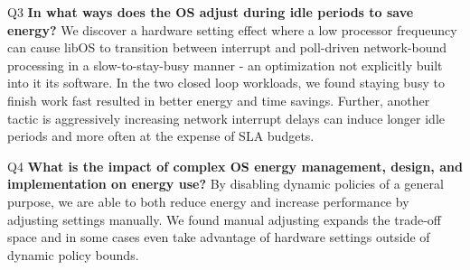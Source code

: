 \begin{compactdesc}

\item[Q3] {\bf In what ways does the OS adjust during idle periods to save energy?}
We discover a hardware setting effect where a low processor frequeuncy can cause libOS to transition between interrupt and poll-driven network-bound processing in a slow-to-stay-busy manner - an optimization not explicitly built into it its software. In the two closed loop workloads, we found staying busy to finish work fast resulted in better energy and time savings. Further, another tactic is aggressively increasing network interrupt delays can induce longer idle periods and more often at the expense of SLA budgets.


\item[Q4] {\bf What is the impact of complex OS energy management, design, and implementation on energy use?}
By disabling dynamic policies of a general purpose, we are able to both reduce energy and increase performance by adjusting settings manually. We found manual adjusting expands the trade-off space and in some cases even take advantage of hardware settings outside of dynamic policy bounds.

\end{compactdesc}


